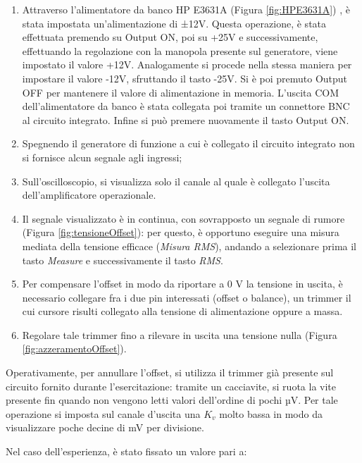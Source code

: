 \begin{enumerate}
    \item Attraverso l'alimentatore da banco HP E3631A (Figura \ref{fig:HPE3631A}) , è stata impostata un'alimentazione di ±12V. Questa operazione, è stata effettuata premendo su Output ON, poi  su +25V e successivamente, effettuando la regolazione con la manopola presente sul generatore, viene impostato il valore +12V. Analogamente si procede nella stessa maniera per impostare il valore -12V, sfruttando il tasto -25V.  Si è poi premuto Output OFF per mantenere il valore di alimentazione in memoria. L'uscita COM dell'alimentatore da banco è stata collegata poi tramite un connettore BNC al circuito integrato. Infine si può premere nuovamente il tasto Output ON. 
    \item Spegnendo il generatore di funzione a cui è collegato il circuito integrato non si fornisce alcun segnale agli ingressi;
    \item  Sull’oscilloscopio, si visualizza solo il canale al quale è collegato l’uscita dell’amplificatore operazionale.
    \item  Il segnale visualizzato è in continua, con sovrapposto un segnale di rumore (Figura \ref{fig:tensioneOffset}): per questo, è opportuno eseguire una misura mediata della tensione efficace (\textit{Misura RMS}), andando a selezionare prima il tasto \textit{Measure} e successivamente il tasto \textit{RMS}.
    \item  Per compensare l’offset in modo da riportare a 0 V la tensione in uscita, è necessario collegare fra i due pin interessati (offset o balance), un trimmer il cui cursore risulti collegato alla tensione di alimentazione oppure a massa.
    \item Regolare tale trimmer fino a rilevare in uscita una tensione nulla (Figura \ref{fig:azzeramentoOffset}). 
\end{enumerate}

Operativamente, per annullare l’offset, si utilizza il trimmer già presente sul circuito fornito durante l’esercitazione: tramite un cacciavite, si ruota la vite presente fin quando non vengono letti valori dell’ordine di pochi µV.  Per tale operazione si imposta  sul canale d'uscita una  $K_v$ molto bassa in modo da visualizzare  poche decine di mV per divisione.
  
Nel caso dell'esperienza, è stato fissato un valore pari a:

